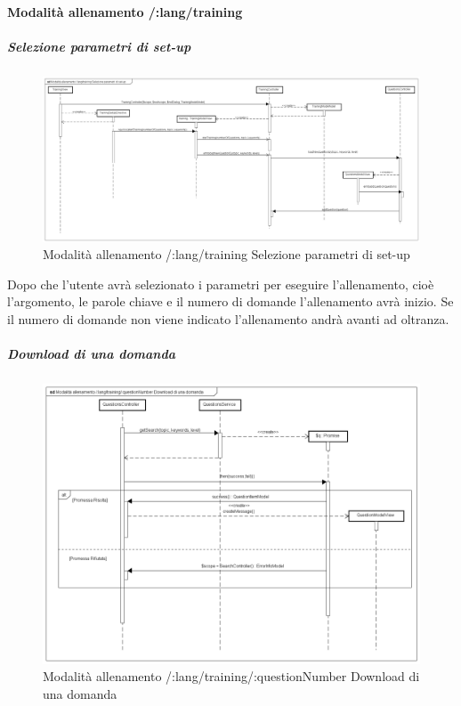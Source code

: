 \paragraph{Modalità allenamento /:lang/training}

\subparagraph{Selezione parametri di set-up}

\label{Modalità allenamento /:lang/training Selezione parametri di set-up}

\begin{figure}[ht]
	\centering
	\includegraphics[scale=0.25,keepaspectratio]{UML/DiagrammiDiSequenza/Front-end/Training_setUp.png}
	\caption{Modalità allenamento /:lang/training Selezione parametri di set-up}
\end{figure} \FloatBarrier

Dopo che l'utente avrà selezionato i parametri per eseguire l'allenamento, cioè l'argomento, le parole chiave e il numero di domande l'allenamento avrà inizio. Se il numero di domande non viene indicato l'allenamento andrà avanti ad oltranza.

\subparagraph{Download di una domanda}

\label{Modalità allenamento /:lang/training/:questionNumber Download di una domanda}

\begin{figure}[ht]
	\centering
	\includegraphics[scale=0.25,keepaspectratio]{UML/DiagrammiDiSequenza/Front-end/Training_downloadAquestion.png}
	\caption{Modalità allenamento /:lang/training/:questionNumber Download di una domanda}
\end{figure} \FloatBarrier


